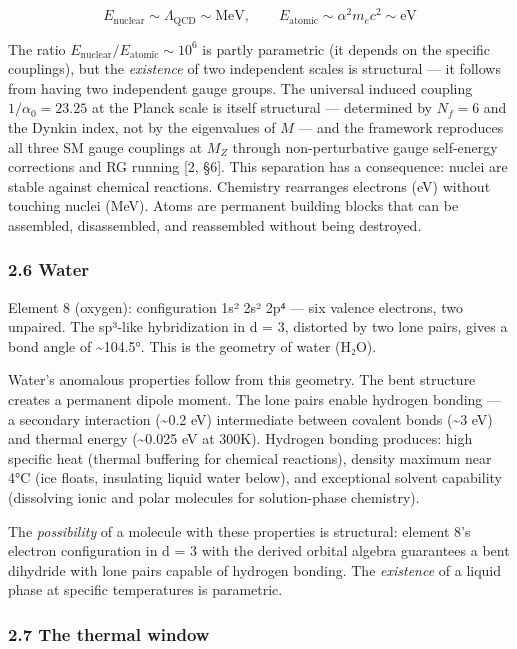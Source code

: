 \documentclass[
]{article}
\begin{document}
\[E_{\text{nuclear}} \sim \Lambda_{\text{QCD}} \sim \text{MeV}, \qquad E_{\text{atomic}} \sim \alpha^2 m_e c^2 \sim \text{eV}\]

The ratio \(E_{\text{nuclear}} / E_{\text{atomic}} \sim 10^6\) is partly
parametric (it depends on the specific couplings), but the
\emph{existence} of two independent scales is structural --- it follows
from having two independent gauge groups. The universal induced coupling
\(1/\alpha_0 = 23.25\) at the Planck scale is itself structural ---
determined by \(N_f = 6\) and the Dynkin index, not by the eigenvalues
of \(M\) --- and the framework reproduces all three SM gauge couplings
at \(M_Z\) through non-perturbative gauge self-energy corrections and RG
running {[}2, §6{]}. This separation has a consequence: nuclei are
stable against chemical reactions. Chemistry rearranges electrons (eV)
without touching nuclei (MeV). Atoms are permanent building blocks that
can be assembled, disassembled, and reassembled without being destroyed.

\hypertarget{water}{%
\subsubsection{2.6 Water}\label{water}}

Element 8 (oxygen): configuration 1s² 2s² 2p⁴ --- six valence electrons,
two unpaired. The sp³-like hybridization in d = 3, distorted by two lone
pairs, gives a bond angle of \textasciitilde104.5°. This is the geometry
of water (H₂O).

Water's anomalous properties follow from this geometry. The bent
structure creates a permanent dipole moment. The lone pairs enable
hydrogen bonding --- a secondary interaction (\textasciitilde0.2 eV)
intermediate between covalent bonds (\textasciitilde3 eV) and thermal
energy (\textasciitilde0.025 eV at 300K). Hydrogen bonding produces:
high specific heat (thermal buffering for chemical reactions), density
maximum near 4°C (ice floats, insulating liquid water below), and
exceptional solvent capability (dissolving ionic and polar molecules for
solution-phase chemistry).

The \emph{possibility} of a molecule with these properties is
structural: element 8's electron configuration in d = 3 with the derived
orbital algebra guarantees a bent dihydride with lone pairs capable of
hydrogen bonding. The \emph{existence} of a liquid phase at specific
temperatures is parametric.

\hypertarget{the-thermal-window}{%
\subsubsection{2.7 The thermal window}\label{the-thermal-window}}
\end{document}
